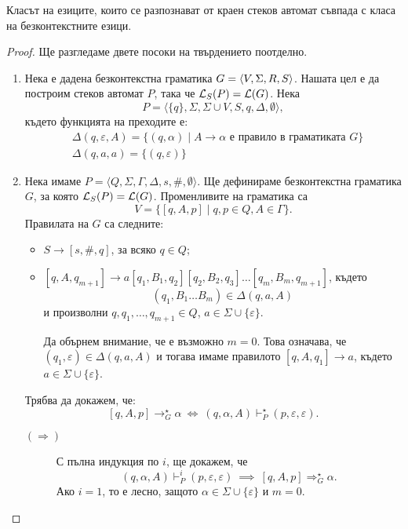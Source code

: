\begin{framed}
\begin{thm}
  \label{th:push-down-context-free}
  Класът на езиците, които се разпознават от краен стеков автомат съвпада с
  класа на безконтекстните езици.
\end{thm}
\end{framed}
\begin{proof}
  Ще разгледаме двете посоки на твърдението поотделно.
  \begin{enumerate}[1)]
  \item 
    Нека е дадена безконтекстна граматика $G = \langle{V,\Sigma,R,S}\rangle$.
    Нашата цел е да построим стеков автомат $P$, така че $\mathcal{L}_S(P) = \mathcal{L}(G)$.
    Нека  \[P = \langle{\{q\},\Sigma,\Sigma\cup V,S,q,\Delta,\emptyset}\rangle,\]
    където функцията на преходите е:
    \begin{align*}
      & \Delta(q,\varepsilon,A) = \{(q,\alpha)\mid A\to\alpha\mbox{ е правило в граматиката }G\}\\
      & \Delta(q,a,a) = \{(q,\varepsilon)\}
    \end{align*}
  \item
    Нека имаме $P = \langle{Q, \Sigma, \Gamma, \Delta, s, \#, \emptyset}\rangle$.
    Ще дефинираме безконтекстна граматика $G$, за която $\mathcal{L}_S(P) = \mathcal{L}(G)$.
    Променливите на граматика са 
    \[V = \{[q,A,p] \mid q,p \in Q, A \in \Gamma\}.\]
    Правилата на $G$ са следните:
    \begin{itemize}
    \item
      $S \to [s,\#,q]$, за всяко $q \in Q$;
    \item
      $[q,A,q_{m+1}] \to a[q_1,B_1,q_2][q_2,B_2,q_3]\dots [q_m,B_m,q_{m+1}]$,
      където 
      \[(q_1,B_1\dots B_m) \in \Delta(q, a, A)\]
      и произволни $q,q_1,\dots,q_{m+1} \in Q$,
      $a \in \Sigma \cup \{\varepsilon\}$.

      Да обърнем внимание, че е възможно $m = 0$.
      Това означава, че $(q_1,\varepsilon) \in \Delta(q, a, A)$ и тогава имаме правилото $[q,A,q_{1}] \to a$, където $a \in \Sigma \cup \{\varepsilon\}$.
    \end{itemize}
    Трябва да докажем, че:
    \[[q,A,p] \rightarrow^\star_G \alpha\ \Leftrightarrow\ (q,\alpha,A) \vdash^\star_P (p,\varepsilon,\varepsilon).\]
    \begin{description}
    \item[$(\Rightarrow)$]
      С пълна индукция по $i$, ще докажем, че 
      \[(q,\alpha,A) \vdash^i_P (p,\varepsilon,\varepsilon)\ \implies\ [q,A,p] \Rightarrow^\star_G \alpha.\]
      Ако $i = 1$, то е лесно, защото $\alpha \in \Sigma \cup\{\varepsilon\}$ и $m = 0$.


\end{description}
\end{enumerate}
\end{proof}
